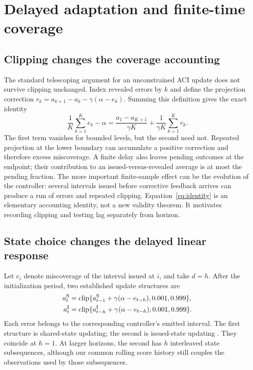 \documentclass[preprint,11pt]{elsarticle}
\newcommand{\clip}{\operatorname{clip}}
\begin{document}
\section{Delayed adaptation and finite-time coverage}
\subsection{Clipping changes the coverage accounting}
The standard telescoping argument for an unconstrained ACI update does not survive
clipping unchanged. Index revealed errors by $k$ and define the projection correction
$r_k=a_{k+1}-a_k-\gamma(\alpha-e_k)$. Summing this definition gives the exact identity
\begin{equation}\label{eq:identity}
 \frac{1}{K}\sum_{k=1}^K e_k-\alpha
 =\frac{a_1-a_{K+1}}{\gamma K}+\frac{1}{\gamma K}\sum_{k=1}^K r_k.
\end{equation}
The first term vanishes for bounded levels, but the second need not. Repeated projection
at the lower boundary can accumulate a positive correction and therefore excess
miscoverage. A finite delay also leaves pending outcomes at the endpoint; their contribution
to an issued-versus-revealed average is at most the pending fraction. The more important
finite-sample effect can be the evolution of the controller: several intervals issued
before corrective feedback arrives can produce a run of errors and repeated clipping.
Equation~\eqref{eq:identity} is an elementary accounting identity, not a new validity theorem.
It motivates recording clipping and testing lag separately from horizon.

\subsection{State choice changes the delayed linear response}\label{sec:topology}
Let $e_i$ denote miscoverage of the interval issued at $i$, and take $d=h$.
After the initialization period, two established update structures are
\begin{align}
 a_t^{\rm S}&=\clip\{a_{t-1}^{\rm S}+\gamma(\alpha-e_{t-h}),0.001,0.999\},\label{eq:shared}\\
 a_t^{\rm I}&=\clip\{a_{t-h}^{\rm I}+\gamma(\alpha-e_{t-h}),0.001,0.999\}.\label{eq:issued}
\end{align}
Each error belongs to the corresponding controller's emitted interval. The first
structure is shared-state updating; the second is issued-state updating
\citep{wang2026acmcp,elhalabi2026delayed}. They coincide at $h=1$. At larger horizons,
the second has $h$ interleaved state subsequences, although our common rolling score
history still couples the observations used by those subsequences.
\end{document}
